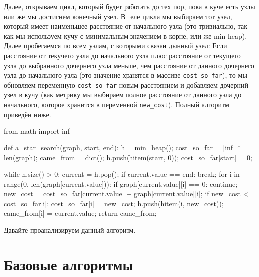 Далее, открываем цикл, который будет работать до тех пор, пока в куче 
есть узлы или же мы достигнем конечный узел. В теле цикла мы выбираем 
тот узел, который имеет наименьшее расстояние от начального узла (это тривиально, 
так как мы используем кучу с минимальным значением в корне, или же min heap). 
Далее пробегаемся по всем узлам, с которыми связан дынный узел: Если 
расстояние от текучего узла до начального узла плюс расстояние от текущего узла 
до выбранного дочернего узла меньше, чем расстояние от данного дочернего узла до 
начального узла (это значение хранятся в массиве \texttt{cost\_so\_far}), то мы обновляем переменную 
\texttt{cost\_so\_far} новым расстоянием и добавляем дочерний узел в кучу 
(как метрику мы выбираем полное расстояние от данного узла до начального,
которое хранится в переменной \texttt{new\_cost}).  Полный алгоритм приведён ниже.

\begin{python}
from math import inf

def a_star_search(graph, start, end):
	h = min_heap();
	cost_so_far = [inf] * len(graph);
	came_from = dict();
	h.push(hitem(start, 0));
	cost_so_far[start] = 0;

	while h.size() > 0:
		current = h.pop();
		if current.value == end:
			break;
		for i in range(0, len(graph[current.value])):
			if graph[current.value][i] == 0:
				continue;
			new_cost = cost_so_far[current.value] + graph[current.value][i];
			if new_cost < cost_so_far[i]: 
				cost_so_far[i] = new_cost;
				h.push(hitem(i, new_cost));
				came_from[i] = current.value;
	return came_from;
\end{python}

Давайте проанализируем данный алгоритм. 

\chapter{Базовые алгоритмы}

